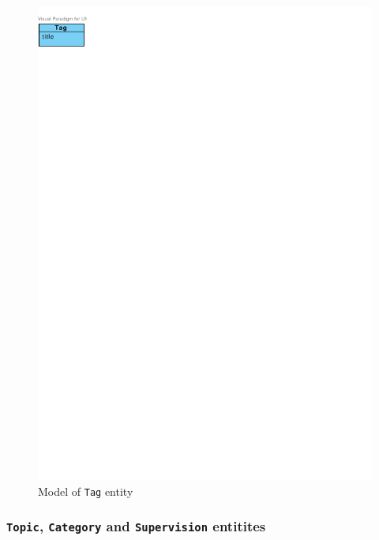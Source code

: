 \begin{figure}[h]
    \centering
        \includegraphics[trim=0 770 510 30, clip, keepaspectratio]{./images/domain-tag-entity.pdf}
    \caption{Model of \texttt{Tag} entity}
    \label{fig:domain-tag-entity}
\end{figure}

\subsubsection{\texttt{Topic}, \texttt{Category} and \texttt{Supervision} entitites}

\faketext[5]

